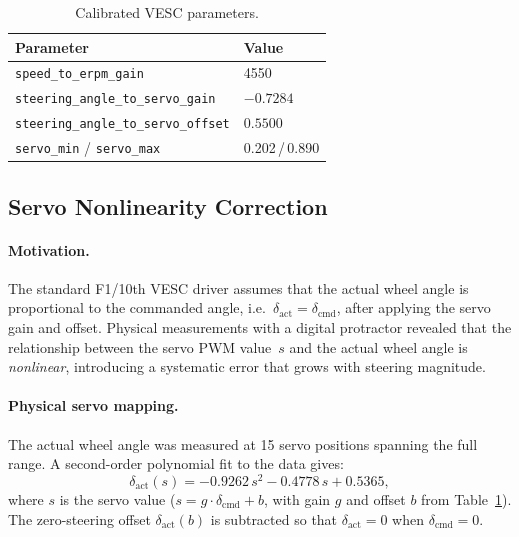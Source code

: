 \documentclass[11pt,a4paper]{article}
\begin{document}
\begin{table}[H]
\centering
\caption{Calibrated VESC parameters.}\label{tab:vesc-cal}
\begin{tabular}{ll}
\toprule
\textbf{Parameter} & \textbf{Value} \\
\midrule
\texttt{speed\_to\_erpm\_gain}              & 4550 \\
\texttt{steering\_angle\_to\_servo\_gain}   & $-0.7284$ \\
\texttt{steering\_angle\_to\_servo\_offset} & $0.5500$ \\
\texttt{servo\_min} / \texttt{servo\_max}   & 0.202\,/\,0.890 \\
\bottomrule
\end{tabular}
\end{table}

\subsection{Servo Nonlinearity Correction}\label{sec:servo-correction}

\paragraph{Motivation.}
The standard F1/10th VESC driver assumes that the actual wheel angle
is proportional to the commanded angle, i.e.\
$\delta_\text{act} = \delta_\text{cmd}$, after applying the servo gain
and offset.  Physical measurements with a digital protractor revealed
that the relationship between the servo PWM value~$s$ and the actual
wheel angle is \emph{nonlinear}, introducing a systematic error that
grows with steering magnitude.

\paragraph{Physical servo mapping.}
The actual wheel angle was measured at 15 servo positions spanning the
full range.  A second-order polynomial fit to the data gives:
\begin{equation}\label{eq:servo-poly}
  \delta_\text{act}(s) = -0.9262\,s^2 - 0.4778\,s + 0.5365,
\end{equation}
where $s$ is the servo value ($s = g \cdot \delta_\text{cmd} + b$,
with gain $g$ and offset $b$ from Table~\ref{tab:vesc-cal}).
The zero-steering offset $\delta_\text{act}(b)$ is subtracted so that
$\delta_\text{act} = 0$ when $\delta_\text{cmd} = 0$.
\end{document}
